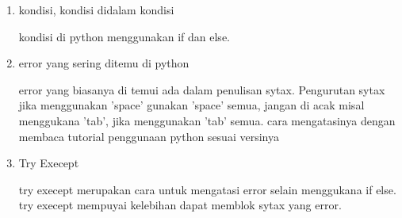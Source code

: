\begin{enumerate}
\item kondisi, kondisi didalam kondisi 
\begin{flushleft}
\qquad kondisi di python menggunakan if dan else.
\end{flushleft}



\item error yang sering ditemu di python
\begin{flushleft}
\qquad error yang biasanya di temui ada dalam penulisan sytax. Pengurutan sytax jika menggunakan 'space' gunakan 'space' semua, jangan di acak misal menggukana 'tab', jika menggunakan 'tab' semua. cara mengatasinya dengan membaca tutorial penggunaan python sesuai versinya\\
\end{flushleft}

\item Try Execept
\begin{flushleft}
\qquad try execept merupakan cara untuk mengatasi error selain menggukana if else. try execept mempuyai kelebihan dapat memblok sytax yang error.\\
\end{flushleft}



\end{enumerate}

